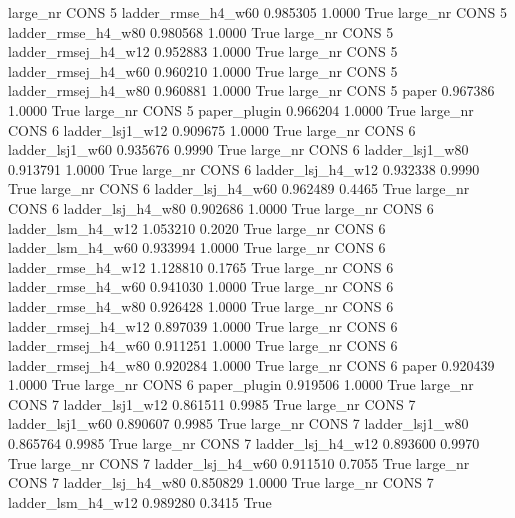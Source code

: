   large_nr     CONS                 5  ladder_rmse_h4_w60   0.985305      1.0000    True
  large_nr     CONS                 5  ladder_rmse_h4_w80   0.980568      1.0000    True
  large_nr     CONS                 5 ladder_rmsej_h4_w12   0.952883      1.0000    True
  large_nr     CONS                 5 ladder_rmsej_h4_w60   0.960210      1.0000    True
  large_nr     CONS                 5 ladder_rmsej_h4_w80   0.960881      1.0000    True
  large_nr     CONS                 5               paper   0.967386      1.0000    True
  large_nr     CONS                 5        paper_plugin   0.966204      1.0000    True
  large_nr     CONS                 6     ladder_lsj1_w12   0.909675      1.0000    True
  large_nr     CONS                 6     ladder_lsj1_w60   0.935676      0.9990    True
  large_nr     CONS                 6     ladder_lsj1_w80   0.913791      1.0000    True
  large_nr     CONS                 6   ladder_lsj_h4_w12   0.932338      0.9990    True
  large_nr     CONS                 6   ladder_lsj_h4_w60   0.962489      0.4465    True
  large_nr     CONS                 6   ladder_lsj_h4_w80   0.902686      1.0000    True
  large_nr     CONS                 6   ladder_lsm_h4_w12   1.053210      0.2020    True
  large_nr     CONS                 6   ladder_lsm_h4_w60   0.933994      1.0000    True
  large_nr     CONS                 6  ladder_rmse_h4_w12   1.128810      0.1765    True
  large_nr     CONS                 6  ladder_rmse_h4_w60   0.941030      1.0000    True
  large_nr     CONS                 6  ladder_rmse_h4_w80   0.926428      1.0000    True
  large_nr     CONS                 6 ladder_rmsej_h4_w12   0.897039      1.0000    True
  large_nr     CONS                 6 ladder_rmsej_h4_w60   0.911251      1.0000    True
  large_nr     CONS                 6 ladder_rmsej_h4_w80   0.920284      1.0000    True
  large_nr     CONS                 6               paper   0.920439      1.0000    True
  large_nr     CONS                 6        paper_plugin   0.919506      1.0000    True
  large_nr     CONS                 7     ladder_lsj1_w12   0.861511      0.9985    True
  large_nr     CONS                 7     ladder_lsj1_w60   0.890607      0.9985    True
  large_nr     CONS                 7     ladder_lsj1_w80   0.865764      0.9985    True
  large_nr     CONS                 7   ladder_lsj_h4_w12   0.893600      0.9970    True
  large_nr     CONS                 7   ladder_lsj_h4_w60   0.911510      0.7055    True
  large_nr     CONS                 7   ladder_lsj_h4_w80   0.850829      1.0000    True
  large_nr     CONS                 7   ladder_lsm_h4_w12   0.989280      0.3415    True
